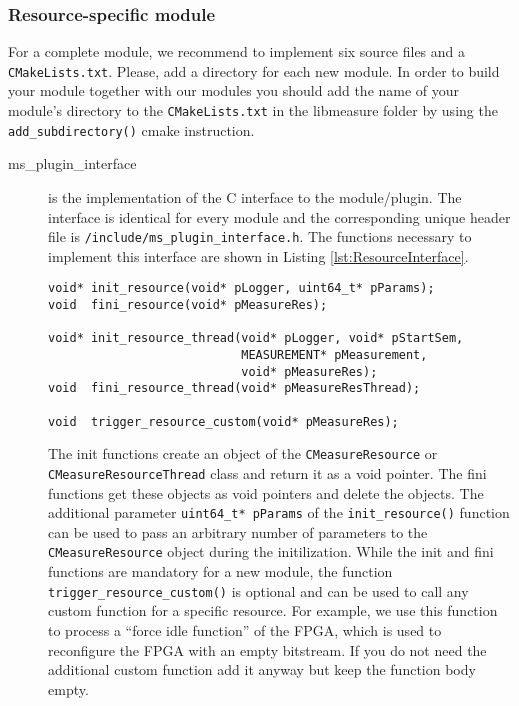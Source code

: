 \subsubsection{Resource-specific module}
For a complete module, we recommend to implement six source files and a \texttt{CMakeLists.txt}. Please, add a directory for each new module. In order to build your module together with our modules you should add the name of your module's directory to the \texttt{CMakeLists.txt} in the libmeasure folder by using the \texttt{add\_subdirectory()} cmake instruction.
\begin{description}
	\item[ms\_plugin\_interface] is the implementation of the C interface to the module/plugin. The interface is identical for every module and the corresponding unique header file is \texttt{/include/ms\_plugin\_interface.h}. The functions necessary to implement this interface are shown in Listing \ref{lst:ResourceInterface}.
	
	\begin{lstlisting}[caption={Interface that each plugin must implement.}, label=lst:ResourceInterface]
void* init_resource(void* pLogger, uint64_t* pParams);
void  fini_resource(void* pMeasureRes);

void* init_resource_thread(void* pLogger, void* pStartSem,
						   MEASUREMENT* pMeasurement,
						   void* pMeasureRes);
void  fini_resource_thread(void* pMeasureResThread);

void  trigger_resource_custom(void* pMeasureRes);
	\end{lstlisting}
	The init functions create an object of the \texttt{CMeasureResource} or \\ \texttt{CMeasureResourceThread} class and return it as a void pointer. The fini functions get these objects as void pointers and delete the objects.
	The additional parameter \texttt{uint64\_t* pParams} of the \texttt{init\_resource()} function can be used to pass an arbitrary number of parameters to the \\\texttt{CMeasureResource} object during the initilization. While the init and fini functions are mandatory for a new module, the function \\\texttt{trigger\_resource\_custom()} is optional and can be used to call any custom function for a specific resource. For example, we use this function to process a ``force idle function'' of the FPGA, which is used to reconfigure the FPGA with an empty bitstream. If you do not need the additional custom function add it anyway but keep the function body empty.
	

\end{description}
